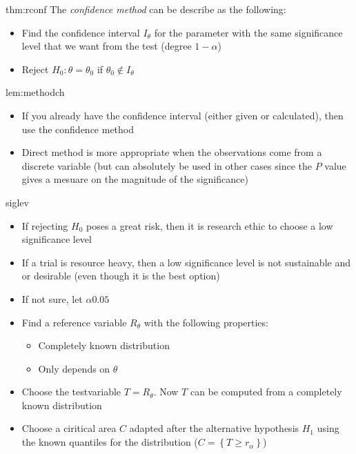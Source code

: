 \begin{theo}{thm:rconf}
  The \textit{confidence method} can be describe as the following:\par
  \begin{itemize}
    \item Find the confidence interval $I_\theta$ for the parameter with the same significance level that we want from the test (degree $1-\alpha$)
    \item Reject $H_0: \theta=\theta_0$ if $\theta_0\not\in I_{\theta}$
  \end{itemize}
\end{theo}
\par\bigskip
\begin{lem}{lem:methodch}
  \begin{itemize}
    \item If you already have the confidence interval (either given or calculated), then use the confidence method
      \par\bigskip
    \item Direct method is more appropriate when the observations come from a discrete variable (but can absolutely be used in other cases since the $P$ value gives a mesuare on the magnitude of the significance)
  \end{itemize}
\end{lem}
\par\bigskip
\begin{lem}{siglev}
  \begin{itemize}
    \item If rejecting $H_0$ poses a great risk, then it is research ethic to choose a low significance level
    \item If a trial is resource heavy, then a low significance level is not sustainable and or desirable (even though it is the best option) 
    \item If not sure, let $\alpha 0.05$
  \end{itemize}
\end{lem}
\par\bigskip
\begin{lem}{}
  \begin{itemize}
    \item Find a reference variable $R_\theta$ with the following properties:\par
      \begin{itemize}
        \item Completely known distribution
        \item Only depends on $\theta$
      \end{itemize}
      \par\bigskip
    \item Choose the testvariable $T = R_\theta$. Now $T$ can be computed from a completely known distribution
      \par\bigskip
  \item Choose a ciritical area $C$ adapted after the alternative hypothesis $H_1$ using the known quantiles for the distribution ($C = \left\{T\geq r_\alpha\right\}$) 
  \end{itemize}
\end{lem}
